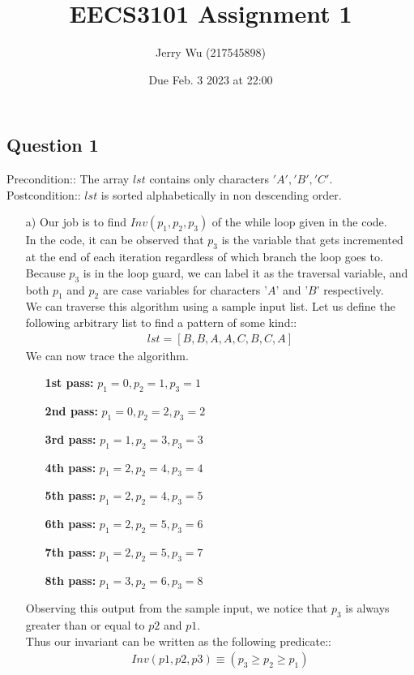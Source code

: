 \documentclass[12pt]{article}
\title{EECS3101 Assignment 1}
\author{Jerry Wu (217545898)}
\date{Due Feb. 3 2023 at 22:00}
\begin{document}
\maketitle
\subsection*{Question 1}
Precondition:: The array $lst$ contains only characters $'A','B','C'$.\\
Postcondition:: $lst$ is sorted alphabetically in non descending order.

\begin{itemize}

    \item[a)] Our job is to find $Inv(p_1,p_2,p_3)$ of the while loop given in the code. \\
    In the code, it can be observed that $p_3$ is the variable that gets incremented at the end of each iteration regardless of which branch the loop goes to.\\ Because $p_3$ is in the loop guard, we can label it as the traversal variable, and both $p_1$ and $p_2$ are case variables for characters '$A$' and '$B$' respectively.\\
    We can traverse this algorithm using a sample input list. Let us define the following arbitrary list to find a pattern of some kind::\\
    \begin{align*}
        lst=[B,B,A,A,C,B,C,A]
    \end{align*}
    We can now trace the algorithm.
    \begin{itemize}
        \item[\textbf{1st pass:}] $p_1=0,p_2=1,p_3=1$
        \item[\textbf{2nd pass:}] $p_1=0,p_2=2,p_3=2$
        \item[\textbf{3rd pass:}] $p_1=1,p_2=3,p_3=3$
        \item[\textbf{4th pass:}] $p_1=2,p_2=4,p_3=4$
        \item[\textbf{5th pass:}] $p_1=2,p_2=4,p_3=5$
        \item[\textbf{6th pass:}] $p_1=2,p_2=5,p_3=6$
        \item[\textbf{7th pass:}] $p_1=2,p_2=5,p_3=7$
        \item[\textbf{8th pass:}] $p_1=3,p_2=6,p_3=8$
    \end{itemize}
    Observing this output from the sample input, we notice that $p_3$ is always greater than or equal to $p2$ and $p1$.\\
    Thus our invariant can be written as the following predicate::
    \begin{align*}
        Inv(p1,p2,p3)\equiv(p_3\geq p_2\geq p_1)
    \end{align*}


\end{itemize}
\end{document}
